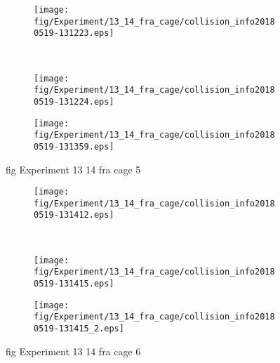 \begin{figure}[H]
	\centering
	\begin{subfigure}[b]{0.45\textwidth}
		\texttt{[image: fig/Experiment/13\_14\_fra\_cage/collision\_info20180519-131223.eps]}
		\caption{}
		\label{fig:Experiment:13_14_fra_cage:collision_info20180519-131223}
	\end{subfigure}
	~
	\begin{subfigure}[b]{0.45\textwidth}
		\texttt{[image: fig/Experiment/13\_14\_fra\_cage/collision\_info20180519-131224.eps]}
		\caption{}
		\label{fig:Experiment:13_14_fra_cage:collision_info20180519-131224}
	\end{subfigure}

	\begin{subfigure}[b]{0.45\textwidth}
		\texttt{[image: fig/Experiment/13\_14\_fra\_cage/collision\_info20180519-131359.eps]}
		\caption{}
		\label{fig:Experiment:13_14_fra_cage:collision_info20180519-131359}
	\end{subfigure}
	\caption{fig Experiment 13 14 fra cage 5}
	\label{fig:Experiment:13_14_fra_cage:5}
\end{figure}

\begin{figure}[H]
	\centering
	\begin{subfigure}[b]{0.45\textwidth}
		\texttt{[image: fig/Experiment/13\_14\_fra\_cage/collision\_info20180519-131412.eps]}
		\caption{}
		\label{fig:Experiment:13_14_fra_cage:collision_info20180519-131412}
	\end{subfigure}
	~
	\begin{subfigure}[b]{0.45\textwidth}
		\texttt{[image: fig/Experiment/13\_14\_fra\_cage/collision\_info20180519-131415.eps]}
		\caption{}
		\label{fig:Experiment:13_14_fra_cage:collision_info20180519-131415}
	\end{subfigure}

	\begin{subfigure}[b]{0.45\textwidth}
		\texttt{[image: fig/Experiment/13\_14\_fra\_cage/collision\_info20180519-131415\_2.eps]}
		\caption{}
		\label{fig:Experiment:13_14_fra_cage:collision_info20180519-131415_2}
	\end{subfigure}
	\caption{fig Experiment 13 14 fra cage 6}
	\label{fig:Experiment:13_14_fra_cage:6}
\end{figure}

